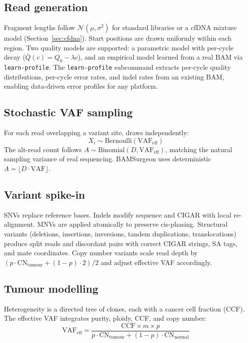 \subsection{Read generation}

Fragment lengths follow $\mathcal{N}(\mu, \sigma^2)$ for standard libraries or a cfDNA mixture model (Section~\ref{sec:cfdna}).
Start positions are drawn uniformly within each region.
Two quality models are supported: a parametric model with per-cycle decay ($\bar{Q}(c) = Q_0 - \lambda c$), and an empirical model learned from a real BAM via \texttt{learn-profile}.
The \texttt{learn-profile} subcommand extracts per-cycle quality distributions, per-cycle error rates, and indel rates from an existing BAM, enabling data-driven error profiles for any platform.

\subsection{Stochastic VAF sampling}

For each read overlapping a variant site, \varforge{} draws independently:
\begin{equation}
  X_i \sim \text{Bernoulli}(\text{VAF}_\text{eff})
  \label{eq:bernoulli}
\end{equation}
The alt-read count follows $A \sim \text{Binomial}(D, \text{VAF}_\text{eff})$, matching the natural sampling variance of real sequencing.
BAMSurgeon uses deterministic $A = \lfloor D \cdot \text{VAF} \rfloor$.

\subsection{Variant spike-in}

SNVs replace reference bases.
Indels modify sequence and CIGAR with local re-alignment.
MNVs are applied atomically to preserve cis-phasing.
Structural variants (deletions, insertions, inversions, tandem duplications, translocations) produce split reads and discordant pairs with correct CIGAR strings, SA tags, and mate coordinates.
Copy number variants scale read depth by $(p \cdot \text{CN}_\text{tumour} + (1-p) \cdot 2) / 2$ and adjust effective VAF accordingly.

\subsection{Tumour modelling}

Heterogeneity is a directed tree of clones, each with a cancer cell fraction (CCF).
The effective VAF integrates purity, ploidy, CCF, and copy number:
\begin{equation}
  \text{VAF}_\text{eff} = \frac{\text{CCF} \times m \times p}{p \cdot \text{CN}_\text{tumour} + (1-p) \cdot \text{CN}_\text{normal}}
  \label{eq:vaf}
\end{equation}


